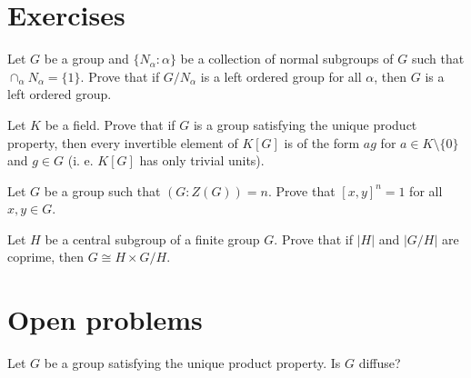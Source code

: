 \section{Exercises}

\begin{prob}
	Let $G$ be a group and $\{N_\alpha:\alpha\}$ be a collection of normal subgroups of $G$ such that
	$\cap_{\alpha}N_\alpha=\{1\}$. Prove that if $G/N_{\alpha}$ is a left ordered group for all $\alpha$, then 
	$G$ is a left ordered group. 
\end{prob}

\begin{prob}
	Let $K$ be a field. Prove that if $G$ is a group satisfying the unique product property, then every invertible element of $K[G]$ is of the form $ag$ for $a\in K\setminus\{ 0\}$ and $g\in G$ (i. e. $K[G]$ has only trivial units).
\end{prob}

\begin{prob}
	\label{xca:[x,y]^n=1}
	Let $G$ be a group such that $(G:Z(G))=n$. Prove that $[x,y]^n=1$ for all $x,y\in G$. 
\end{prob}

\begin{prob}
	Let $H$ be a central subgroup of a finite group $G$. Prove that if $|H|$
	and $|G/H|$ are coprime, then $G\cong H\times G/H$.
\end{prob}


\section{Open problems}
\begin{problem}\label{UPimpliesdiff}
Let $G$ be a group satisfying the unique product property. Is $G$ diffuse?
\end{problem}


